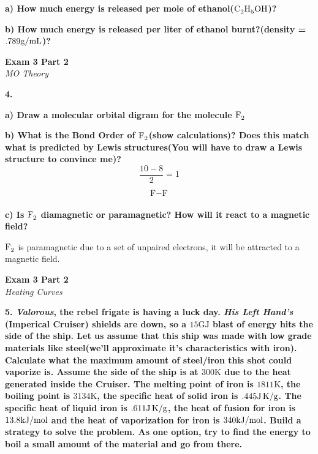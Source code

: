\documentclass{article}
\begin{document}
    \textbf{a) How much energy is released per mole of ethanol($\ce{C2H5OH}$)?}

    \textbf{b) How much energy is released per liter of ethanol burnt?(density = $.789 \si[per-mode=symbol]{\gram\per\milli\liter}$)?}
    \pagebreak

    \begin{center}
        \textbf{Exam 3 Part 2}\\
        \textit{MO Theory}
    \end{center}
    \textbf{4.}

    \textbf{a) Draw a molecular orbital digram for the molecule $\ce{F2}$}

    \textbf{b) What is the Bond Order of $\ce{F2}$(show calculations)? Does this match what is predicted by Lewis structures(You will have to draw a Lewis structure to convince me)?}
    $$ \dfrac{10 - 8}{2} = 1$$
    $$ \ce{F-F}$$

    \textbf{c) Is $\ce{F2}$ diamagnetic or paramagnetic? How will it react to a magnetic field?}

    $\ce{F2}$ is paramagnetic due to a set of  unpaired electrons, it will be attracted to a magnetic field.
    \pagebreak

    \begin{center}
        \textbf{Exam 3 Part 2}\\
        \textit{Heating Curves}
    \end{center}
    \textbf{5. \textit{Valorous}, the rebel frigate is having a luck day. \textit{His Left Hand's} (Imperical Cruiser) shields are down, so a $15 \si{\giga\joule}$ blast of energy hits the side of the ship. Let us assume that this ship was made with low grade materials like steel(we'll approximate it's characteristics with iron). Calculate what the maximum amount of steel/iron this shot could vaporize is. Assume the side of the ship is at $300 \si{\kelvin}$ due to the heat generated inside the Cruiser. The melting point of iron is $1811 \si{\kelvin}$, the boiling point is $3134 \si{\kelvin}$, the specific heat of solid iron is $.445 \si[per-mode=symbol]{\joule\per\gram\kelvin}$. The specific heat of liquid iron is $.611 \si[per-mode=symbol]{\joule\per\gram\kelvin}$, the heat of fusion for iron is $13.8 \si[per-mode=symbol]{\kilo\joule\per\mole}$ and the heat of vaporization for iron is $340 \si[per-mode=symbol]{\kilo\joule\per\mole}$. Build a strategy to solve the problem. As one option, try to find the energy to boil a small amount of the material and go from there.}
    \pagebreak
\end{document}
